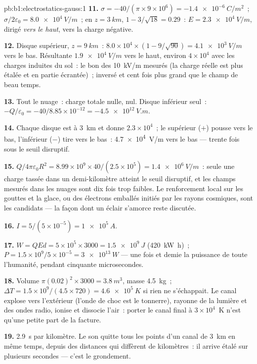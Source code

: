 \begin{solution}{pb:b1:electrostatics-gauss:1}
\textbf{11.} $\sigma = -40/(\pi \times 9 \times 10^6) = \qty{-1.4e-6}{C/m^2}$~; $\sigma/2\varepsilon_0 =
\qty{8.0e4}{V/m}$~; en $z = \qty{3}{km}$, $1 - 3/\sqrt{18} = 0.29$~: $E =
\qty{2.3e4}{V/m}$, dirigé \emph{vers le haut}, vers la charge négative.

\textbf{12.} Disque supérieur, $z = \qty{9}{km}$~: $8.0 \times 10^4 \times (1 - 9/\sqrt{90}) =
\qty{4.1e3}{V/m}$ vers le bas. Résultante $\qty{1.9e4}{V/m}$ vers le haut, environ $4 \times 10^4$
avec les charges induites du sol~: le bon  des \qty{10}{kV/m}
mesurés (la charge réelle est plus étalée et en partie écrantée)~; inversé et
cent fois plus grand que le champ de beau temps.

\textbf{13.} Tout le nuage~: charge totale nulle,  nul. Disque inférieur
seul~: $-Q/\varepsilon_0 = -40/8.85 \times 10^{-12} = \qty{-4.5e12}{V.m}$.

\textbf{14.} Chaque disque est à \qty{3}{km} et donne $2.3 \times 10^4$~; le
supérieur ($+$) pousse vers le bas, l'inférieur ($-$) tire vers le bas~:
\qty{4.7e4}{V/m} vers le bas --- trente fois sous le seuil disruptif.

\textbf{15.} $Q/4\pi\varepsilon_0R^2 = 8.99 \times 10^9 \times 40/(2.5 \times 10^5) =
\qty{1.4e6}{V/m}$~: seule une charge tassée dans un demi-kilomètre atteint le
seuil disruptif, et les champs mesurés dans les nuages sont dix fois trop
faibles. Le renforcement local sur les gouttes et la glace, ou des électrons
emballés initiés par les rayons cosmiques, sont les candidats --- la façon dont
un éclair s'amorce reste discutée.

\textbf{16.} $I = 5/(5 \times 10^{-5}) = \qty{1e5}{A}$.

\textbf{17.} $W = QEd = 5 \times 10^5 \times 3000 = \qty{1.5e9}{J}$ (\qty{420}{kW h})~;
$P = 1.5 \times 10^9/5 \times 10^{-5} = \qty{3e13}{W}$ --- une fois et demie la
puissance de toute l'humanité, pendant cinquante microsecondes.

\textbf{18.} Volume $\pi(0.02)^2 \times 3000 = \qty{3.8}{m^3}$, masse \qty{4.5}{kg}~;
$\Delta T = 1.5 \times 10^9/(4.5 \times 720) = \qty{4.6e5}{K}$ si rien ne s'échappait.
Le canal explose vers l'extérieur (l'onde de choc est le tonnerre), rayonne de
la lumière et des ondes radio, ionise et dissocie l'air~: porter le canal final
à $3 \times 10^4$~K n'est qu'une petite part de la facture.

\textbf{19.} \qty{2.9}{s} par kilomètre. Le son quitte tous les points d'un
canal de \qty{3}{km} en même temps, depuis des distances qui diffèrent de
kilomètres~: il arrive étalé sur plusieurs secondes --- c'est le grondement.


\end{solution}
